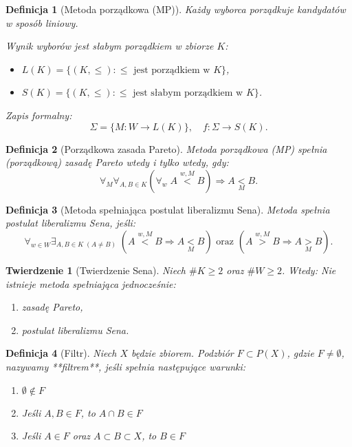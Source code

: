 \documentclass[12pt,a4paper]{article}
\theoremstyle{break}
\newtheorem{definition}{Definicja}[section]
\newtheorem{theorem}{Twierdzenie}[section]
\begin{document}
	\begin{definition}[Metoda porządkowa (MP)]
		Każdy wyborca porządkuje kandydatów w sposób liniowy.
		
		Wynik wyborów jest słabym porządkiem w zbiorze $K$:
		\begin{itemize}
			\item $L(K) = \{(K, \leq) : \leq \text{ jest porządkiem w } K\}$,
			\item $S(K) = \{(K, \leq) : \leq \text{ jest słabym porządkiem w } K\}$.
		\end{itemize}
		
		Zapis formalny:
		\[
		\Sigma = \{ M : W \rightarrow L(K) \}, \quad f : \Sigma \rightarrow S(K).
		\]
	\end{definition}

	\begin{definition}[Porządkowa zasada Pareto]
		Metoda porządkowa (MP) spełnia (porządkową) zasadę Pareto wtedy i tylko wtedy, gdy:
		\[
		\forall_M \forall_{A, B \in K} \left( \forall_w \; A \overset{w, M}{<} B \right) \Rightarrow A \underset{M}{<} B.
		\]
	\end{definition}
	
	\begin{definition}[Metoda spełniająca postulat liberalizmu Sena]
		Metoda spełnia postulat liberalizmu Sena, jeśli:
		\[
		\forall_{w \in W} \exists_{A, B \in K \; (A \neq B)} \; \left( A \overset{w, M}{<} B \Rightarrow A \underset{M}{<} B \right) \text{ oraz } \left( A \overset{w, M}{>} B \Rightarrow A \underset{M}{>} B \right).
		\]
	\end{definition}
	
	\begin{theorem}[Twierdzenie Sena]
		Niech $\# K \geq 2$ oraz $\# W \geq 2$. Wtedy:
		Nie istnieje metoda spełniająca jednocześnie:
		\begin{enumerate}
			\item zasadę Pareto,
			\item postulat liberalizmu Sena.
		\end{enumerate}
	\end{theorem}

	\begin{definition}[Filtr]
		Niech $X$ będzie zbiorem. Podzbiór $F \subset P(X)$, gdzie $F \neq \emptyset$, nazywamy **filtrem**, jeśli spełnia następujące warunki:
		\begin{enumerate}[1)]
			\item $\emptyset \notin F$
			\item Jeśli $A, B \in F$, to $A \cap B \in F$
			\item Jeśli $A \in F$ oraz $A \subset B \subset X$, to $B \in F$
		\end{enumerate}
	\end{definition}
\end{document}
